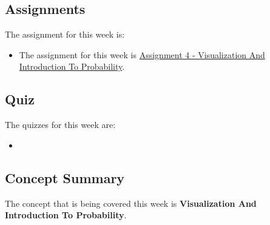 \subsection{Assignments}

The assignment for this week is:

\begin{itemize}
    \item The assignment for this week is \href{https://github.com/QuantumCompiler/CU/tree/main/CSPB%203022%20-%20Introduction%20To%20Data%20Science%20With%20Probability%20And%20Statistics/CSPB%203022%20-%20Assignments/CSPB%203022%20-%20Assignment%204%20-%20Visualization%20And%20Introduction%20To%20Probability}{Assignment 4 - Visualization And Introduction To Probability}. 
\end{itemize}

\subsection{Quiz}

The quizzes for this week are:

\begin{itemize}
    \item {} \textbullet {} 
\end{itemize}

\subsection{Concept Summary}

The concept that is being covered this week is \textbf{Visualization And Introduction To Probability}.

